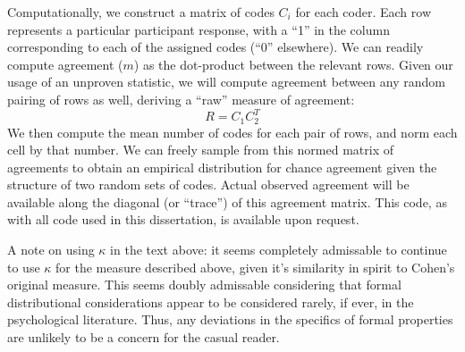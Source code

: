 Computationally, we construct a matrix of codes $C_i$ for each coder.
Each row represents a particular participant response, with a “1” in the column
corresponding to each of the assigned codes (“0” elsewhere). We can readily
compute agreement ($m$) as the dot-product between the relevant rows. Given our
usage of an unproven statistic, we will compute agreement between any random
pairing of rows as well, deriving a “raw” measure of agreement: \[R = C_1C_2^T\]
We then compute the mean number of codes for each pair of rows, and norm each
cell by that number. We can freely sample from this normed matrix of agreements
to obtain an empirical distribution for chance agreement given the structure of
two random sets of codes. Actual observed agreement will be available along the
diagonal (or “trace”) of this agreement matrix. This code, as with all code used
in this dissertation, is available upon request.

A note on using $\kappa$ in the text above: it seems completely admissable to
continue to use $\kappa$ for the measure described above, given it's similarity
in spirit to Cohen's original measure. This seems doubly admissable considering
that formal distributional considerations appear to be considered rarely, if
ever, in the psychological literature. Thus, any deviations in the specifics of
formal properties are unlikely to be a concern for the casual reader.
